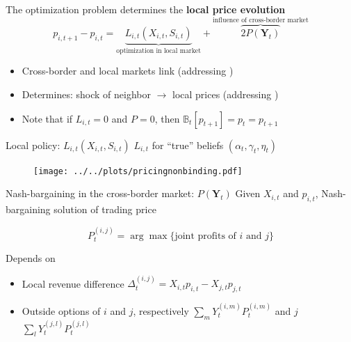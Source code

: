 \documentclass{beamer}
\newcommand{\B}{\mathbb{B}}
\newcommand{\matr}[1]{\bm{#1}}
\newcommand{\Y}{\matr{Y}}
\begin{document}
\begin{frame}

    The optimization problem determines the \textbf{local price evolution}
    \begin{equation*}
        p_{i, t+1} - p_{i, t} = \underbrace{L_{i, t}(X_{i, t}, S_{i, t})}_{\text{optimization in local market}} + \overbrace{2 P(\Y_t)}^{\text{influence of cross-border market}}
    \end{equation*}

    \begin{itemize} \setlength\itemsep{1.5em}
        \item Cross-border and local markets link (addressing \citeauthor{Gebhardt2013})
        \item Determines: shock of neighbor $\xrightarrow{}$ local prices (addressing \citeauthor{Bockers2014})
        \item Note that if $L_{i, t} = 0$ and $P = 0$, then $\B_t[p_{t+1}] = p_t = p_{t+1}$
    \end{itemize}

\end{frame}

\begin{frame}{Local policy: $L_{i, t}(X_{i, t}, S_{i, t})$}
    $L_{i, t}$ for ``true'' beliefs $(\alpha_t, \gamma_t, \eta_t)$
    \begin{figure}
        \texttt{[image: ../../plots/pricingnonbinding.pdf]}
    \end{figure}
\end{frame}

\begin{frame}{Nash-bargaining in the cross-border market: $P(\Y_t)$}
    Given $X_{i, t}$ and $p_{i, t}$, Nash-bargaining solution of trading price

    \begin{equation*}
        P_t^{(i, j)} = \arg \max \{  \text{joint profits of $i$ and $j$} \}
    \end{equation*}

    Depends on

    \begin{itemize} \setlength\itemsep{1.5em}
        \item Local revenue difference $\Delta^{(i, j)}_t = X_{i, t} p_{i, t} - X_{j, t} p_{j, t} $
        \item Outside options of $i$ and $j$, respectively $\sum_m Y_t^{(i, m)} P_t^{(i, m)}$ and $j$ $\sum_l Y_t^{(j, l)} P_t^{(j, l)}$
    \end{itemize}

\end{frame}
\end{document}
